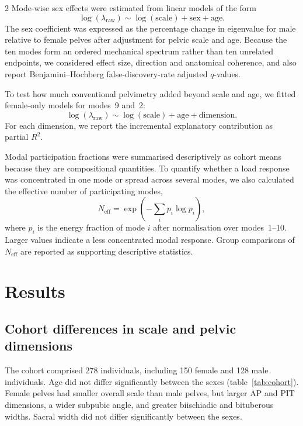\documentclass[openacc]{rsproca_new}
\begin{document}
\begin{multicols}{2}
Mode-wise sex effects were estimated from linear models of the form
\begin{equation}
\log(\lambda_{\mathrm{raw}}) \sim \log(\mathrm{scale}) + \mathrm{sex} + \mathrm{age}.
\end{equation}
The sex coefficient was expressed as the percentage change in eigenvalue for male relative to female pelves after adjustment for pelvic scale and age. Because the ten modes form an ordered mechanical spectrum rather than ten unrelated endpoints, we considered effect size, direction and anatomical coherence, and also report Benjamini--Hochberg false-discovery-rate adjusted $q$-values.

To test how much conventional pelvimetry added beyond scale and age, we fitted female-only models for modes~9 and~2:
\begin{equation}
\log(\lambda_{\mathrm{raw}}) \sim \log(\mathrm{scale}) + \mathrm{age} + \mathrm{dimension}.
\end{equation}
For each dimension, we report the incremental explanatory contribution as partial $R^2$.

Modal participation fractions were summarised descriptively as cohort means because they are compositional quantities. To quantify whether a load response was concentrated in one mode or spread across several modes, we also calculated the effective number of participating modes,
\begin{equation}
N_{\mathrm{eff}} = \exp\left(-\sum_i p_i\log p_i\right),
\end{equation}
where $p_i$ is the energy fraction of mode $i$ after normalisation over modes~1--10. Larger values indicate a less concentrated modal response. Group comparisons of $N_{\mathrm{eff}}$ are reported as supporting descriptive statistics.

\section{Results}
\subsection{Cohort differences in scale and pelvic dimensions}

The cohort comprised 278 individuals, including 150 female and 128 male individuals. Age did not differ significantly between the sexes (table~\ref{tab:cohort}). Female pelves had smaller overall scale than male pelves, but larger AP and PIT dimensions, a wider subpubic angle, and greater biischiadic and bituberous widths. Sacral width did not differ significantly between the sexes.


\end{multicols}
\end{document}
